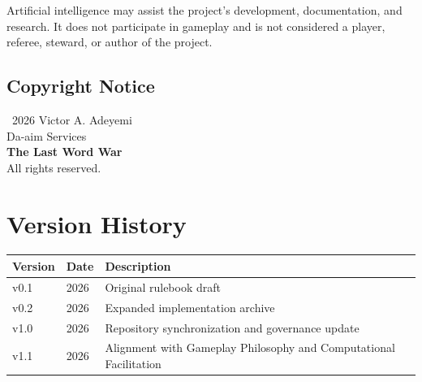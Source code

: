 \documentclass[11pt,a4paper]{article}
\begin{document}
Artificial intelligence may assist the project's development, documentation, and research. It does not participate in gameplay and is not considered a player, referee, steward, or author of the project.

\subsection{Copyright Notice}

\begin{center}
\textcopyright\ 2026 Victor A. Adeyemi\\
Da-aim Services\\
\textbf{The Last Word War\texttrademark}\\
All rights reserved.
\end{center}

\section{Version History}

\begin{center}
\begin{tabular}{lll}
\toprule
\textbf{Version} & \textbf{Date} & \textbf{Description} \\
\midrule
v0.1 & 2026 & Original rulebook draft \\
v0.2 & 2026 & Expanded implementation archive \\
v1.0 & 2026 & Repository synchronization and governance update \\
v1.1 & 2026 & Alignment with Gameplay Philosophy and Computational Facilitation \\
\bottomrule
\end{tabular}
\end{center}
\end{document}
